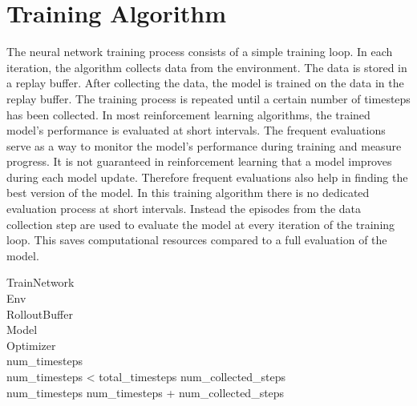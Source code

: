 \section{Training Algorithm}



The neural network training process consists of a simple training loop. In each iteration, the algorithm collects data from the environment. The data is stored in a replay buffer. After collecting the data, the model is trained on the data in the replay buffer. The training process is repeated until a certain number of timesteps has been collected.  
In most reinforcement learning algorithms, the trained model's performance is evaluated at short intervals. The frequent evaluations serve as a way to monitor the model's performance during training and measure progress. It is not guaranteed in reinforcement learning that a model improves during each model update. Therefore frequent evaluations also help in finding the best version of the model.  
In this training algorithm there is no dedicated evaluation process at short intervals. Instead the episodes from the data collection step are used to evaluate the model at every iteration of the training loop. This saves computational resources compared to a full evaluation of the model.

\renewcommand{\thepseudonum}{\roman{pseudonum}}
\begin{pseudocode}{TrainNetwork}{ }
\label{train_network}
\\

\MAIN
Env \GETS {}\\
RolloutBuffer \GETS {}\\
Model \GETS {}\\
Optimizer \GETS {}\\

num\_timesteps \\
\WHILE num\_timesteps < total\_timesteps \DO 
\BEGIN 
num\_collected\_steps \GETS {}\\
num\_timesteps \GETS num\_timesteps + num\_collected\_steps\\
\\
\END\\
\ENDMAIN
\end{pseudocode}

